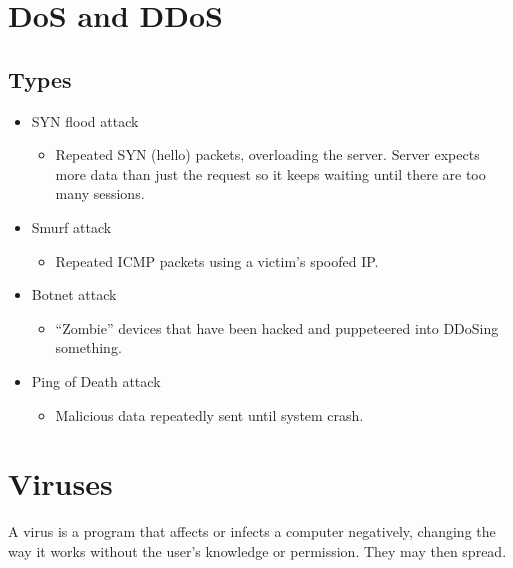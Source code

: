 \documentclass[12pt]{report}
\begin{document}
\pagebreak

\section{DoS and DDoS}
\subsection{Types}
\begin{multicols}{2}
\begin{itemize}
	\item SYN flood attack
		\begin{itemize}
			\item Repeated SYN (hello) packets, overloading the server. Server expects more data than just the request so it keeps waiting until there are too many sessions.
		\end{itemize}
	\item Smurf attack 
		\begin{itemize}
			\item Repeated ICMP packets using a victim's spoofed IP.
		\end{itemize}
	\item Botnet attack
		\begin{itemize}
			\item ``Zombie'' devices that have been hacked and puppeteered into DDoSing something.
		\end{itemize}
	\item Ping of Death attack
		\begin{itemize}
			\item Malicious data repeatedly sent until system crash.
		\end{itemize}

\end{itemize}
\end{multicols}

\section{Viruses}
A virus is a program that affects or infects a computer negatively, changing the way it works without the user's knowledge or permission. They may then spread.
\end{document}
